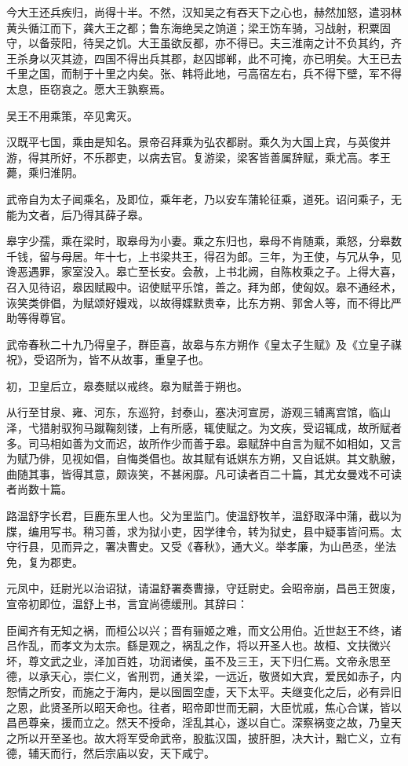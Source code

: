 \documentclass[]{article}
\begin{document}
今大王还兵疾归，尚得十半。不然，汉知吴之有吞天下之心也，赫然加怒，遣羽林黄头循江而下，龚大王之都；鲁东海绝吴之饷道；梁王饬车骑，习战射，积粟固守，以备荥阳，待吴之饥。大王虽欲反都，亦不得已。夫三淮南之计不负其约，齐王杀身以灭其迹，四国不得出兵其郡，赵囚邯郸，此不可掩，亦已明矣。大王已去千里之国，而制于十里之内矣。张、韩将此地，弓高宿左右，兵不得下壁，军不得太息，臣窃哀之。愿大王孰察焉。

吴王不用乘策，卒见禽灭。

汉既平七国，乘由是知名。景帝召拜乘为弘农都尉。乘久为大国上宾，与英俊并游，得其所好，不乐郡吏，以病去官。复游梁，梁客皆善属辞赋，乘尤高。孝王薨，乘归淮阴。

武帝自为太子闻乘名，及即位，乘年老，乃以安车蒲轮征乘，道死。诏问乘子，无能为文者，后乃得其薛子皋。

皋字少孺，乘在梁时，取皋母为小妻。乘之东归也，皋母不肯随乘，乘怒，分皋数千钱，留与母居。年十七，上书梁共王，得召为郎。三年，为王使，与冗从争，见谗恶遇罪，家室没入。皋亡至长安。会赦，上书北阙，自陈枚乘之子。上得大喜，召入见待诏，皋因赋殿中。诏使赋平乐馆，善之。拜为郎，使匈奴。皋不通经术，诙笑类俳倡，为赋颂好嫚戏，以故得媟默贵幸，比东方朔、郭舍人等，而不得比严助等得尊官。

武帝春秋二十九乃得皇子，群臣喜，故皋与东方朔作《皇太子生赋》及《立皇子禖祝》，受诏所为，皆不从故事，重皇子也。

初，卫皇后立，皋奏赋以戒终。皋为赋善于朔也。

从行至甘泉、雍、河东，东巡狩，封泰山，塞决河宣房，游观三辅离宫馆，临山泽，弋猎射驭狗马蹴鞠刻镂，上有所感，辄使赋之。为文疾，受诏辄成，故所赋者多。司马相如善为文而迟，故所作少而善于皋。皋赋辞中自言为赋不如相如，又言为赋乃俳，见视如倡，自悔类倡也。故其赋有诋娸东方朔，又自诋娸。其文骫骳，曲随其事，皆得其意，颇诙笑，不甚闲靡。凡可读者百二十篇，其尤女曼戏不可读者尚数十篇。

路温舒字长君，巨鹿东里人也。父为里监门。使温舒牧羊，温舒取泽中蒲，截以为牒，编用写书。稍习善，求为狱小吏，因学律令，转为狱史，县中疑事皆问焉。太守行县，见而异之，署决曹史。又受《春秋》，通大义。举孝廉，为山邑丞，坐法免，复为郡吏。

元凤中，廷尉光以治诏狱，请温舒署奏曹掾，守廷尉史。会昭帝崩，昌邑王贺废，宣帝初即位，温舒上书，言宜尚德缓刑。其辞曰：

臣闻齐有无知之祸，而桓公以兴；晋有骊姬之难，而文公用伯。近世赵王不终，诸吕作乱，而孝文为太宗。繇是观之，祸乱之作，将以开圣人也。故桓、文扶微兴坏，尊文武之业，泽加百姓，功润诸侯，虽不及三王，天下归仁焉。文帝永思至德，以承天心，崇仁义，省刑罚，通关梁，一远近，敬贤如大宾，爱民如赤子，内恕情之所安，而施之于海内，是以囹圄空虚，天下太平。夫继变化之后，必有异旧之恩，此贤圣所以昭天命也。往者，昭帝即世而无嗣，大臣忧戚，焦心合谋，皆以昌邑尊亲，援而立之。然天不授命，淫乱其心，遂以自亡。深察祸变之故，乃皇天之所以开至圣也。故大将军受命武帝，股肱汉国，披肝胆，决大计，黜亡义，立有德，辅天而行，然后宗庙以安，天下咸宁。
\end{document}
